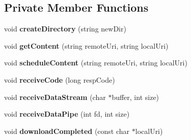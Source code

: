 \subsection*{Private Member Functions}
\begin{CompactItemize}
\item 
void \textbf{createDirectory} (string newDir)\label{classbr_1_1pucrio_1_1telemidia_1_1ginga_1_1ncl_1_1prefetch_1_1PrefetchManager_8488793a46c9a84265711e09094dd12f}

\item 
void \textbf{getContent} (string remoteUri, string localUri)\label{classbr_1_1pucrio_1_1telemidia_1_1ginga_1_1ncl_1_1prefetch_1_1PrefetchManager_9b5e7aa874137635f54008d16a09c86d}

\item 
void \textbf{scheduleContent} (string remoteUri, string localUri)\label{classbr_1_1pucrio_1_1telemidia_1_1ginga_1_1ncl_1_1prefetch_1_1PrefetchManager_1135c6b6f10f6c5147df5f18d78d4669}

\item 
void {\bf receiveCode} (long respCode)\label{classbr_1_1pucrio_1_1telemidia_1_1ginga_1_1ncl_1_1prefetch_1_1PrefetchManager_8c3dc204c3ecdf08a78fbf98290034c7}

\item 
void {\bf receiveDataStream} (char $\ast$buffer, int size)\label{classbr_1_1pucrio_1_1telemidia_1_1ginga_1_1ncl_1_1prefetch_1_1PrefetchManager_35cb545927a7fdd47a4f6694dd8af8b8}

\item 
void \textbf{receiveDataPipe} (int fd, int size)\label{classbr_1_1pucrio_1_1telemidia_1_1ginga_1_1ncl_1_1prefetch_1_1PrefetchManager_12edc1a6825db40670b0badba388343b}

\item 
void {\bf downloadCompleted} (const char $\ast$localUri)\label{classbr_1_1pucrio_1_1telemidia_1_1ginga_1_1ncl_1_1prefetch_1_1PrefetchManager_cd7dd8570d54efa5d8eea180f1608c99}

\end{CompactItemize}
